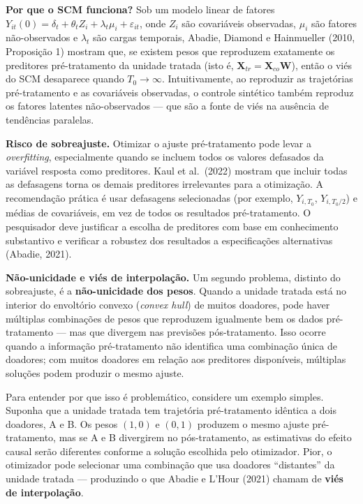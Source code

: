 \documentclass[
]{article}
\begin{document}
\textbf{Por que o SCM funciona?} Sob um modelo linear de fatores \(Y_{it}(0) = \delta_t + \theta_t Z_i + \lambda_t \mu_i + \varepsilon_{it}\), onde \(Z_i\) são covariáveis observadas, \(\mu_i\) são fatores não-observados e \(\lambda_t\) são cargas temporais, Abadie, Diamond e Hainmueller (2010, Proposição 1) mostram que, se existem pesos que reproduzem exatamente os preditores pré-tratamento da unidade tratada (isto é, \(\mathbf{X}_{tr} = \mathbf{X}_{co}\mathbf{W}\)), então o viés do SCM desaparece quando \(T_0 \to \infty\). Intuitivamente, ao reproduzir as trajetórias pré-tratamento e as covariáveis observadas, o controle sintético também reproduz os fatores latentes não-observados --- que são a fonte de viés na ausência de tendências paralelas.

\textbf{Risco de sobreajuste.} Otimizar o ajuste pré-tratamento pode levar a \emph{overfitting}, especialmente quando se incluem todos os valores defasados da variável resposta como preditores. Kaul et al.~(2022) mostram que incluir todas as defasagens torna os demais preditores irrelevantes para a otimização. A recomendação prática é usar defasagens selecionadas (por exemplo, \(Y_{i,T_0}\), \(Y_{i,T_0/2}\)) e médias de covariáveis, em vez de todos os resultados pré-tratamento. O pesquisador deve justificar a escolha de preditores com base em conhecimento substantivo e verificar a robustez dos resultados a especificações alternativas (Abadie, 2021).

\textbf{Não-unicidade e viés de interpolação.} Um segundo problema, distinto do sobreajuste, é a \textbf{não-unicidade dos pesos}. Quando a unidade tratada está no interior do envoltório convexo (\emph{convex hull}) de muitos doadores, pode haver múltiplas combinações de pesos que reproduzem igualmente bem os dados pré-tratamento --- mas que divergem nas previsões pós-tratamento. Isso ocorre quando a informação pré-tratamento não identifica uma combinação única de doadores; com muitos doadores em relação aos preditores disponíveis, múltiplas soluções podem produzir o mesmo ajuste.

Para entender por que isso é problemático, considere um exemplo simples. Suponha que a unidade tratada tem trajetória pré-tratamento idêntica a dois doadores, A e B. Os pesos \((1, 0)\) e \((0, 1)\) produzem o mesmo ajuste pré-tratamento, mas se A e B divergirem no pós-tratamento, as estimativas do efeito causal serão diferentes conforme a solução escolhida pelo otimizador. Pior, o otimizador pode selecionar uma combinação que usa doadores ``distantes'' da unidade tratada --- produzindo o que Abadie e L'Hour (2021) chamam de \textbf{viés de interpolação}.
\end{document}
